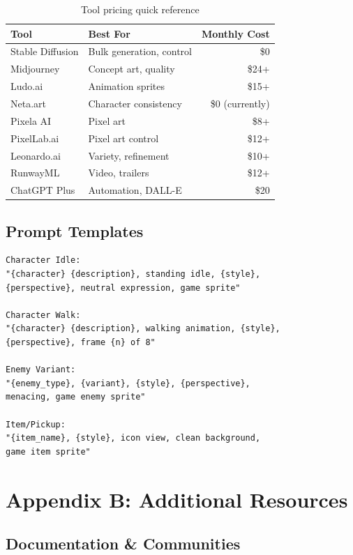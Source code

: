 \documentclass[11pt]{article}
\begin{document}
\begin{table}[H]
\centering
\begin{tabular}{llr}
\toprule
\textbf{Tool} & \textbf{Best For} & \textbf{Monthly Cost} \\
\midrule
Stable Diffusion & Bulk generation, control & \$0 \\
Midjourney & Concept art, quality & \$24+ \\
Ludo.ai & Animation sprites & \$15+ \\
Neta.art & Character consistency & \$0 (currently) \\
Pixela AI & Pixel art & \$8+ \\
PixelLab.ai & Pixel art control & \$12+ \\
Leonardo.ai & Variety, refinement & \$10+ \\
RunwayML & Video, trailers & \$12+ \\
ChatGPT Plus & Automation, DALL-E & \$20 \\
\bottomrule
\end{tabular}
\caption{Tool pricing quick reference}
\end{table}

\subsection{Prompt Templates}

\begin{lstlisting}[caption={Reusable prompt patterns}]
Character Idle:
"{character} {description}, standing idle, {style},
{perspective}, neutral expression, game sprite"

Character Walk:
"{character} {description}, walking animation, {style},
{perspective}, frame {n} of 8"

Enemy Variant:
"{enemy_type}, {variant}, {style}, {perspective},
menacing, game enemy sprite"

Item/Pickup:
"{item_name}, {style}, icon view, clean background,
game item sprite"
\end{lstlisting}

\section{Appendix B: Additional Resources}

\subsection{Documentation \& Communities}
\end{document}

